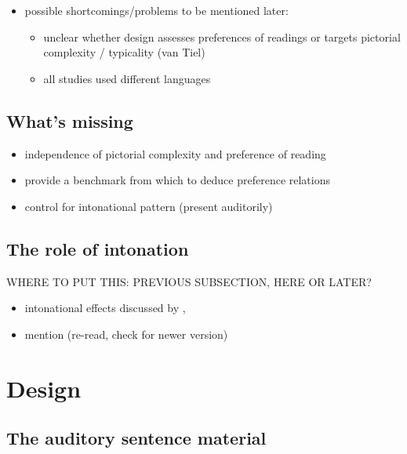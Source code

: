 \documentclass[fleqn,reqno,10pt,draft]{article}
\begin{document}
\begin{itemize}
\item possible shortcomings/problems to be mentioned later:
  \begin{itemize}
  \item unclear whether design assesses preferences of readings or
    targets pictorial complexity / typicality (van Tiel)
  \item all studies used different languages
  \end{itemize}
\end{itemize}



\subsection{What's missing}
\label{sec:whats-missing}

\begin{itemize}
\item independence of pictorial complexity and preference of reading
\item provide a benchmark from which to deduce preference relations
\item control for intonational pattern (present auditorily)
\end{itemize}


\subsection{The role of intonation}
\label{sec:role-intonation}

WHERE TO PUT THIS: PREVIOUS SUBSECTION, HERE OR LATER?

\begin{itemize}
\item intonational effects discussed by
  \citet{Horn2006:The-Border-Wars,Geurts2009:Scalar-Implicat,Geurts2010:Quantity-Implic},
  \citep[c.f.][]{ChemlaSpector2010:Experimental-Ev}
\item mention \citet{SchwarzClifton2008:Strengthening-o} (re-read,
  check for newer version)
\end{itemize}

\newpage



\section{Design}
\label{sec:design}

\subsection{The auditory sentence material}
\label{sec:audit-sent-mater}
\end{document}
